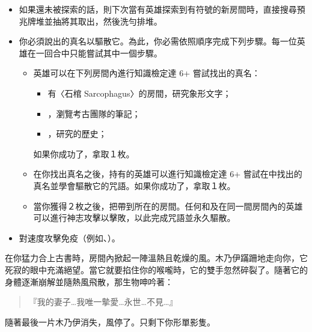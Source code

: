 \vspace*{-1em}
\begin{itemize}
  \item 如果還未被探索的話，則下次當有英雄探索到有\OmenSymbol{}符號的新房間時，直接搜尋預兆牌堆並抽將其取出，然後洗勻排堆。
  \item 你必須說出的真名以驅散它。為此，你必需依照順序完成下列步驟。每一位英雄在一回合中只能嘗試其中一個步驟。
    \begin{itemize}
      \item 英雄可以在下列房間內進行知識檢定達 6+ 嘗試找出的真名：
        \begin{itemize}
          \item 有〈石棺 Sarcophagus〉的房間，研究象形文字；
          \item {}，瀏覽考古團隊的筆記；
          \item {}，研究的歷史；
        \end{itemize}
        如果你成功了，拿取１枚。
      \item 在你找出真名之後，持有的英雄可以進行知識檢定達 6+ 嘗試在中找出的真名並學會驅散它的咒語。如果你成功了，拿取１枚。
      \item 當你獲得２枚之後，把帶到所在的房間。任何和及在同一間房間內的英雄可以進行神志攻擊以擊敗，以此完成咒語並永久驅散。
    \end{itemize}
  \item {}對速度攻擊免疫（例如、）。
\end{itemize}

\begin{HauntStory}
  在你猛力合上古書時，房間內掀起一陣溫熱且乾燥的風。木乃伊蹣跚地走向你，它死寂的眼中充滿絕望。當它就要掐住你的喉嚨時，它的雙手忽然碎裂了。隨著它的身體逐漸崩解並隨熱風飛散，那生物呻吟著：

  \begin{quote}
    『我的妻子…我唯一摰愛…永世…不見…』
  \end{quote}

  隨著最後一片木乃伊消失，風停了。只剩下你形單影隻。
\end{HauntStory}

